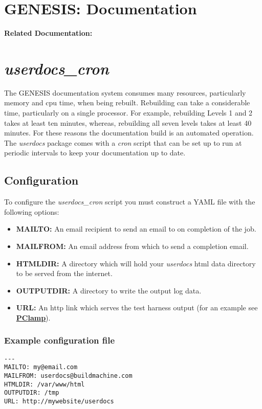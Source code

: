 \documentclass[12pt]{article}
\begin{document}
\section*{GENESIS: Documentation}

{\bf Related Documentation:}

\section*{\it userdocs\_cron}

The GENESIS documentation system consumes many resources, particularly memory and cpu time, when being rebuilt. Rebuilding can take a considerable time, particularly on a single processor. For example, rebuilding Levels 1 and 2 takes at least ten minutes, whereas, rebuilding all seven levels takes at least 40 minutes. For these reasons the documentation build is an automated operation. The {\it userdocs} package comes with a {\it cron} script that can be set up to run at periodic intervals to keep your documentation up to date.

\subsection*{Configuration}

To configure the {\it userdocs\_cron} script you must construct a YAML file with the following options:
\begin{itemize}
   \item {\bf MAILTO:} An email recipient to send an email to on completion of the job.
   \item {\bf MAILFROM:} An email address from which to send a completion email.
   \item {\bf HTMLDIR:} A directory which will hold your {\it userdocs} html data directory to be served from the internet.
   \item {\bf OUTPUTDIR:} A directory to write the output log data.
   \item {\bf URL:} An http link which serves the test harness output (for an example see \href{http://neurospaces.sourceforge.net/neurospaces_project/gshell/tests/html/specifications/pclamp.html}{\bf PClamp}).
\end{itemize}
\subsubsection*{Example configuration file}

\begin{verbatim}
---
MAILTO: my@email.com
MAILFROM: userdocs@buildmachine.com
HTMLDIR: /var/www/html
OUTPUTDIR: /tmp
URL: http://mywebsite/userdocs
\end{verbatim}
\end{document}
